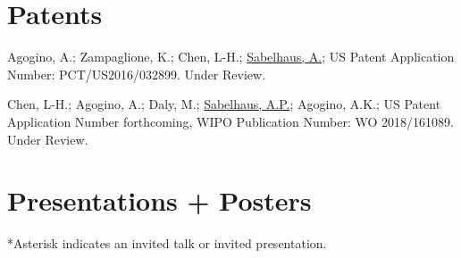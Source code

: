 \documentclass[letterpaper]{deedy-resume} %
\begin{document}
{\begin{etaremune}


\end{etaremune}


\section{Patents}

\vspace{0.2cm}

\begin{etaremune}

\item {} Agogino, A.; Zampaglione, K.; Chen, L-H.; \underline{Sabelhaus, A.}; US Patent Application Number: PCT/US2016/032899. Under Review.

\item {} Chen, L-H.; Agogino, A.; Daly, M.; \underline{Sabelhaus, A.P.}; Agogino, A.K.; US Patent Application Number forthcoming, WIPO Publication Number: WO 2018/161089. Under Review.

\end{etaremune}



\section{Presentations + Posters}

\vspace{0.1cm}


*Asterisk indicates an invited talk or invited presentation.


}
\end{document}
